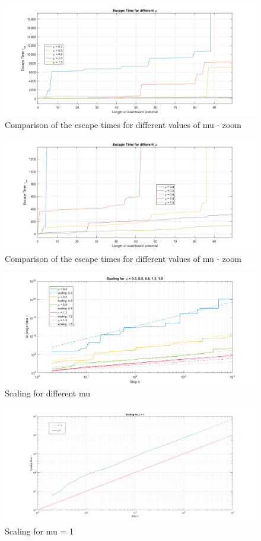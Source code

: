 \documentclass[11pt,letterpaper]{article}
\begin{document}
\begin{figure}
\centering
\includegraphics[width=0.9\linewidth]{./escape_time2}
\caption{Comparison of the escape times for different values of mu - zoom}
\label{fig:escape_time2}
\end{figure}

\begin{figure}
\centering
\includegraphics[width=0.9\linewidth]{./escape_time3}
\caption{Comparison of the escape times for different values of mu - zoom}
\label{fig:escape_time3}
\end{figure}

\begin{figure}
\centering
\includegraphics[width=0.9\linewidth]{./exercise3_2}
\caption{Scaling for different mu}
\label{fig:exercise3_2}
\end{figure}

\begin{figure}
\centering
\includegraphics[width=0.9\linewidth]{./exercise3_3}
\caption{Scaling for mu = 1}
\label{fig:exercise3_3}
\end{figure}
\end{document}
